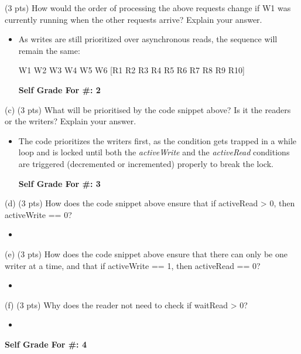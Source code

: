 \documentclass[conference]{IEEEtran}
\begin{document}
\begin{itemize}
(3 pts) How would the order of processing the above requests change if W1 was currently
running when the other requests arrive? Explain your answer.

\begin{itemize}
	\item As writes are still prioritized over asynchronous reads, the sequence will remain the same:
		\begin{center}
		W1 W2 W3 W4 W5 W6 [R1 R2 R3 R4 R5 R6 R7 R8 R9 R10]
	\end{center}
	\begin{center}
		\textbf{Self Grade For \#: 2}
	\end{center}
\end{itemize}

(c) (3 pts) What will be prioritised by the code snippet above? Is it the readers or the writers?
Explain your answer.

\begin{itemize}
	\item The code prioritizes the writers first, as the condition gets trapped in a while loop and is locked until both the \textit{activeWrite} and the \textit{activeRead} conditions are triggered (decremented or incremented) properly to break the lock.
		\begin{center}
		\textbf{Self Grade For \#: 3}
	\end{center}
\end{itemize}

(d) (3 pts) How does the code snippet above ensure that if activeRead > 0, then
activeWrite == 0?

\begin{itemize}
	\item 
\end{itemize}

(e) (3 pts) How does the code snippet above ensure that there can only be one writer at a time,
and that if activeWrite == 1, then activeRead == 0?

\begin{itemize}
	\item 
\end{itemize}

(f) (3 pts) Why does the reader not need to check if waitRead > 0?

\begin{itemize}
	\item 
\end{itemize}

\begin{center}
	\textbf{Self Grade For \#: 4}
\end{center}
\end{itemize}
\end{document}
